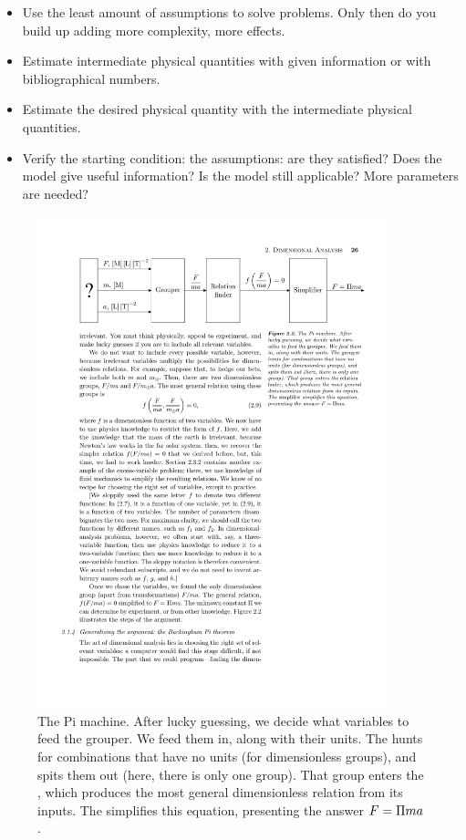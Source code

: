 \begin{itemize}
\item Use the least amount of assumptions to solve problems. Only then do you build up adding more complexity, more effects.
%
\item Estimate intermediate physical quantities with given information or with bibliographical numbers.
%
\item Estimate the desired physical quantity with the intermediate physical quantities.
%
\item Verify the starting condition: the assumptions: are they satisfied? Does the model give useful information? Is the model still applicable? More parameters are needed?
%
\end{itemize}
%
%
\begin{figure}[bt]\label{fig:pimachine}
  \caption{The Pi machine. After lucky guessing, we decide what variables to feed the grouper. We feed them in, along with their units. The  hunts for combinations that have no units (for dimensionless groups), and spits them out (here, there is only one group). That group enters the , which produces the most general dimensionless relation from its inputs. The  simplifies this equation, presenting the answer $F = \Pi ma$.}
  \centering
    \includegraphics[width=0.9\textwidth]{./graphs/pi-machine.pdf}
\end{figure}
